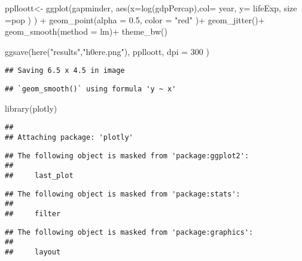 \documentclass[
]{article}
\newenvironment{Shaded}{\begin{snugshade}}{\end{snugshade}}
\newcommand{\AttributeTok}[1]{\textcolor[rgb]{0.77,0.63,0.00}{#1}}
\newcommand{\DecValTok}[1]{\textcolor[rgb]{0.00,0.00,0.81}{#1}}
\newcommand{\FloatTok}[1]{\textcolor[rgb]{0.00,0.00,0.81}{#1}}
\newcommand{\FunctionTok}[1]{\textcolor[rgb]{0.00,0.00,0.00}{#1}}
\newcommand{\NormalTok}[1]{#1}
\newcommand{\OtherTok}[1]{\textcolor[rgb]{0.56,0.35,0.01}{#1}}
\newcommand{\SpecialCharTok}[1]{\textcolor[rgb]{0.00,0.00,0.00}{#1}}
\newcommand{\StringTok}[1]{\textcolor[rgb]{0.31,0.60,0.02}{#1}}
\begin{document}
\begin{Shaded}
\begin{Highlighting}[]
\NormalTok{ pplloott}\OtherTok{\textless{}{-}} \FunctionTok{ggplot}\NormalTok{(gapminder, }\FunctionTok{aes}\NormalTok{(}\AttributeTok{x=}\FunctionTok{log}\NormalTok{(gdpPercap),}\AttributeTok{col=}\NormalTok{ year, }\AttributeTok{y=}\NormalTok{ lifeExp, }\AttributeTok{size =}\NormalTok{pop )}
\NormalTok{) }\SpecialCharTok{+}
  \FunctionTok{geom\_point}\NormalTok{(}\AttributeTok{alpha =} \FloatTok{0.5}\NormalTok{, }\AttributeTok{color =} \StringTok{"red"}\NormalTok{ )}\SpecialCharTok{+}
  \FunctionTok{geom\_jitter}\NormalTok{()}\SpecialCharTok{+} 
  \FunctionTok{geom\_smooth}\NormalTok{(}\AttributeTok{method =}\NormalTok{ lm)}\SpecialCharTok{+}
  \FunctionTok{theme\_bw}\NormalTok{()}

\FunctionTok{ggsave}\NormalTok{(}\FunctionTok{here}\NormalTok{(}\StringTok{"results"}\NormalTok{,}\StringTok{"h0ere.png"}\NormalTok{), pplloott, }\AttributeTok{dpi =} \DecValTok{300}\NormalTok{ )}
\end{Highlighting}
\end{Shaded}

\begin{verbatim}
## Saving 6.5 x 4.5 in image
\end{verbatim}

\begin{verbatim}
## `geom_smooth()` using formula 'y ~ x'
\end{verbatim}

\begin{Shaded}
\begin{Highlighting}[]
\FunctionTok{library}\NormalTok{(plotly)}
\end{Highlighting}
\end{Shaded}

\begin{verbatim}
## 
## Attaching package: 'plotly'
\end{verbatim}

\begin{verbatim}
## The following object is masked from 'package:ggplot2':
## 
##     last_plot
\end{verbatim}

\begin{verbatim}
## The following object is masked from 'package:stats':
## 
##     filter
\end{verbatim}

\begin{verbatim}
## The following object is masked from 'package:graphics':
## 
##     layout
\end{verbatim}
\end{document}
